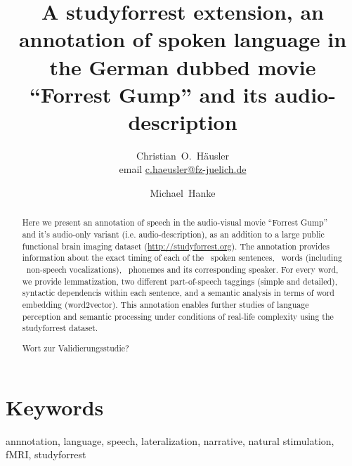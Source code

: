 \documentclass[10pt,a4paper,onecolumn]{article}
\begin{document}



\title{A studyforrest extension, an annotation of spoken language in the German dubbed movie ``Forrest Gump'' and its audio-description}

\author[1, 2]{Christian~O.~Häusler \\ email \href{mailto:c.haeusler@fz-juelich.de}{c.haeusler@fz-juelich.de} }
\author[1, 2]{Michael~Hanke}


\maketitle



\thispagestyle{fancy}
\begin{abstract}
Here we present an annotation of speech in the audio-visual movie ``Forrest Gump'' and it's audio-only variant (i.e. audio-description), as an addition to a large public functional brain imaging dataset (\url{http://studyforrest.org}). The annotation provides information about the exact timing of each of the \aSentencesAll\ spoken sentences, \aWordsAll\ words (including \aPosNonspeechAll\ non-speech vocalizations), \aPhonesAll\ phonemes and its corresponding speaker.
For every word, we provide lemmatization, two different part-of-speech taggings (simple and detailed), syntactic dependencis within each sentence, and a semantic analysis in terms of word embedding (word2vector). This annotation enables further studies of language perception and semantic processing under conditions of real-life complexity using the studyforrest dataset.

Wort zur Validierungsstudie?
\end{abstract}

\section*{Keywords}
annnotation, language, speech, lateralization, narrative, natural stimulation, fMRI, studyforrest
\end{document}
